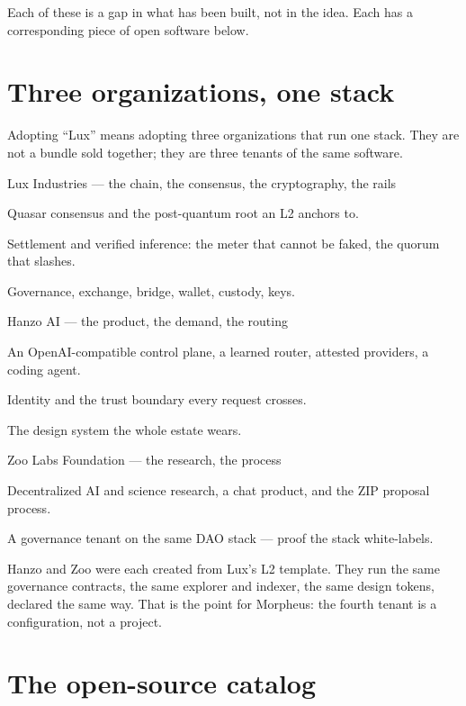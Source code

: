 \documentclass[11pt,a4paper]{article}
\begin{document}
\noindent Each of these is a gap in what has been built, not in the idea. Each has a corresponding piece of
open software below.

\section{Three organizations, one stack}

Adopting ``Lux'' means adopting three organizations that run one stack. They are not a bundle sold
together; they are three tenants of the same software.

\begin{stake}{Lux Industries --- the chain, the consensus, the cryptography, the rails}
\item Quasar consensus and the post-quantum root an L2 anchors to.
\item Settlement and verified inference: the meter that cannot be faked, the quorum that slashes.
\item Governance, exchange, bridge, wallet, custody, keys.
\end{stake}

\begin{stake}{Hanzo AI --- the product, the demand, the routing}
\item An OpenAI-compatible control plane, a learned router, attested providers, a coding agent.
\item Identity and the trust boundary every request crosses.
\item The design system the whole estate wears.
\end{stake}

\begin{stake}{Zoo Labs Foundation --- the research, the process}
\item Decentralized AI and science research, a chat product, and the ZIP proposal process.
\item A governance tenant on the same DAO stack --- proof the stack white-labels.
\end{stake}

\noindent Hanzo and Zoo were each created from Lux's L2 template. They run the same governance
contracts, the same explorer and indexer, the same design tokens, declared the same way. That is the
point for Morpheus: the fourth tenant is a configuration, not a project.

\section{The open-source catalog}
\end{document}
